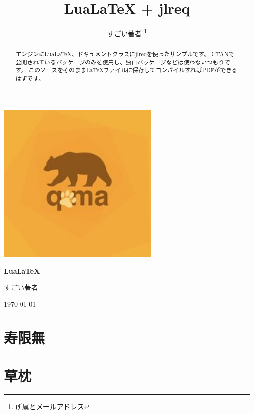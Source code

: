 \documentclass{jlreq}
\title{LuaLaTeX + jlreq}
\author{すごい著者 \thanks{所属とメールアドレス}}
\begin{document}
\begin{titlepage}
    \centering
    \includegraphics[width=0.6\textwidth]{../../../quma.jpeg} %
    \vspace{2cm} %
    {\Huge\bfseries LuaLaTeX\par} %
    \vspace{1.5cm} %
    {\Large すごい著者\par} %
    \vfill %
    {\large \today\par} %
\end{titlepage}

\maketitle
\tableofcontents

\begin{abstract}
エンジンにLuaLaTeX、ドキュメントクラスにjlreqを使ったサンプルです。
CTANで公開されているパッケージのみを使用し、独自パッケージなどは使わないつもりです。
このソースをそのままLaTeXファイルに保存してコンパイルすればPDFができるはずです。

\end{abstract}

\section{寿限無}


\section{草枕}

\end{document}
